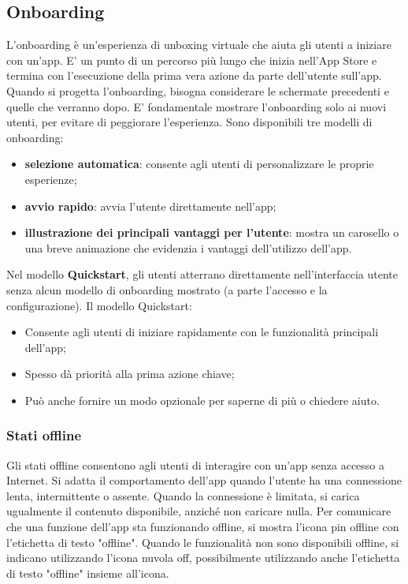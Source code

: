 \documentclass[12pt, a4paper]{report}
\begin{document}
	\subsection{Onboarding}
	L'onboarding è un'esperienza di unboxing virtuale che aiuta gli utenti a iniziare con un'app. E’ un punto di un percorso più lungo che inizia nell'App Store e termina con l'esecuzione della prima vera azione da parte dell'utente sull’app.
	Quando si progetta l’onboarding, bisogna considerare le schermate precedenti e quelle che verranno dopo. E’ fondamentale mostrare l'onboarding solo ai nuovi utenti, per evitare di peggiorare l’esperienza. Sono disponibili tre modelli di onboarding:
	\begin{itemize}
		\item \textbf{selezione automatica}: consente agli utenti di personalizzare le proprie esperienze;
		\item  \textbf{avvio rapido}: avvia l'utente direttamente nell'app;
		\item  \textbf{illustrazione dei principali vantaggi per l'utente}: mostra un carosello o una breve animazione che evidenzia i vantaggi dell'utilizzo dell'app.
	\end{itemize}
	Nel modello \textbf{Quickstart}, gli utenti atterrano direttamente nell'interfaccia utente senza alcun modello di onboarding mostrato (a parte l'accesso e la configurazione). Il modello Quickstart:
	\begin{itemize}
		\item Consente agli utenti di iniziare rapidamente con le funzionalità principali dell'app;
		\item Spesso dà priorità alla prima azione chiave;
		\item Può anche fornire un modo opzionale per saperne di più o chiedere aiuto.
	\end{itemize}

	\subsubsection{Stati offline}
	Gli stati offline consentono agli utenti di interagire con un'app senza accesso a Internet. Si adatta il comportamento dell’app quando l'utente ha una connessione lenta, intermittente o assente. Quando la connessione è limitata, si carica ugualmente il contenuto disponibile,
	anziché non caricare nulla. Per comunicare che una funzione dell’app sta funzionando offline, si mostra l’icona pin offline con l'etichetta di testo "offline". Quando le funzionalità non sono disponibili offline, si indicano utilizzando l’icona nuvola off, possibilmente utilizzando anche l'etichetta di testo "offline" insieme all'icona.
\end{document}
